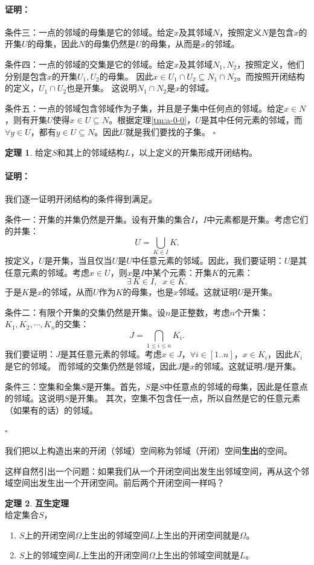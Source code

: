 \documentclass[12pt,UTF8]{ctexbook}
\theoremstyle{definition}
\newtheorem{tm}{定理}[section]
\theoremstyle{plain}
\renewenvironment{proof}{\paragraph{\textbf{证明：}}}{\hfill$\square$}
\begin{document}
\begin{appendix}
\begin{proof}
    条件三：一点的邻域的母集是它的邻域。给定$x$及其邻域$N$，按照定义$N$是包含$x$的开集$U$的母集，因此$N$的母集仍然是$U$的母集，从而是$x$的邻域。

    条件四：一点的邻域的交集是它的邻域。给定$x$及其邻域$N_1, N_2$，按照定义，他们分别是包含$x$的开集$U_1, U_2$的母集。
    因此$x\in U_1\cap U_2 \subseteq N_1\cap N_2 $。而按照开闭结构的定义，$U_1\cap  U_2$也是开集。
    这说明$N_1\cap N_2$是$x$的邻域。

    条件五：一点的邻域包含邻域作为子集，并且是子集中任何点的邻域。给定$x\in N$，则有开集$U$使得$x\in U \subseteq N$。根据定理\ref{tm:a-0-0}，$U$是其中任何元素的邻域，而$\forall y \in U$，都有$y\in U \subseteq N$。因此$U$就是我们要找的子集。
\end{proof}

\begin{tm}
    给定$S$和其上的邻域结构$L$，以上定义的开集形成开闭结构。
\end{tm}

\begin{proof}
    我们逐一证明开闭结构的条件得到满足。

    条件一：开集的并集仍然是开集。设有开集的集合$I$，$I$中元素都是开集。考虑它们的并集：
    $$ U = \bigcup_{K\in I} K. $$
    按定义，$U$是开集，当且仅当$U$是$U$中任意元素的邻域。因此，我们要证明：$U$是其任意元素的邻域。考虑$x\in U$，则$x$是$I$中某个元素：开集$K$的元素：
    $$ \exists \, K \in I, \;\; x \in K.$$
    于是$K$是$x$的邻域，从而$U$作为$K$的母集，也是$x$邻域。这就证明$U$是开集。

    条件二：有限个开集的交集仍然是开集。设$n$是正整数，考虑$n$个开集：$K_1, K_2, \cdots, K_n$的交集：
    $$ J = \bigcap_{1\leqslant i \leqslant n} K_i.$$
    我们要证明：$J$是其任意元素的邻域。考虑$x\in J$，$\forall i\in [1..n]$，$x\in K_i$，因此$K_i$是它的邻域。
    而邻域的交集仍然是邻域，因此$J$是$x$的邻域。这就证明$J$是开集。

    条件三：空集和全集$S$是开集。首先，$S$是$S$中任意点的邻域的母集，因此是任意点的邻域。这说明$S$是开集。
    其次，空集不包含任一点，所以自然是它的任意元素（如果有的话）的邻域。

\end{proof}

我们把以上构造出来的开闭（邻域）空间称为邻域（开闭）空间\textbf{生出}的空间。

这样自然引出一个问题：如果我们从一个开闭空间出发生出邻域空间，再从这个邻域空间出发生出一个开闭空间。前后两个开闭空间一样吗？

\begin{tm}{\textbf{互生定理}}
    \mbox{} \\
    给定集合$S$，
    \begin{enumerate}
        \item $S$上的开闭空间$\Omega$上生出的邻域空间$L$上生出的开闭空间就是$\Omega$。
        \item $S$上的邻域空间$L$上生出的开闭空间$\Omega$上生出的邻域空间就是$L$。
    \end{enumerate}
\end{tm}


\end{appendix}
\end{document}

